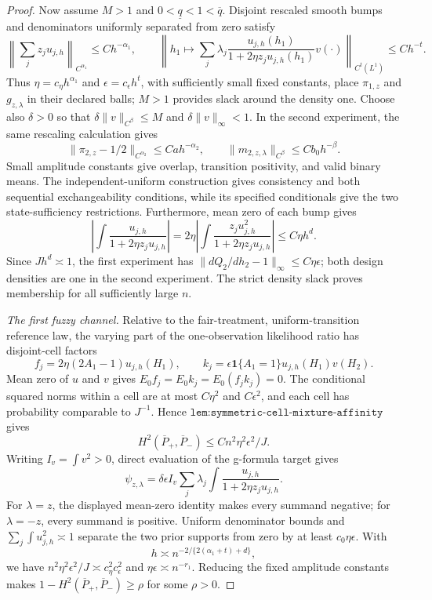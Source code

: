 \documentclass{article}
\begin{document}
\begin{proof}
Now assume \(M>1\) and \(0<\underline q<1<\overline q\). Disjoint rescaled smooth bumps and denominators uniformly separated from zero satisfy
\[\left\|\sum_jz_ju_{j,h}\right\|_{C^{\alpha_1}}\le Ch^{-\alpha_1},\qquad \left\|h_1\mapsto\sum_j\lambda_j\frac{u_{j,h}(h_1)}{1+2\eta z_ju_{j,h}(h_1)}v(\cdot)\right\|_{C^t(L^1)}\le Ch^{-t}.\]
Thus \(\eta=c_\eta h^{\alpha_1}\) and \(\epsilon=c_\epsilon h^t\), with sufficiently small fixed constants, place \(\pi_{1,z}\) and \(g_{z,\lambda}\) in their declared balls; \(M>1\) provides slack around the density one. Choose also \(\delta>0\) so that \(\delta\|v\|_{C^\beta}\le M\) and \(\delta\|v\|_\infty<1\). In the second experiment, the same rescaling calculation gives
\[\|\pi_{2,z}-1/2\|_{C^{\alpha_2}}\le Ca h^{-\alpha_2},\qquad \|m_{2,z,\lambda}\|_{C^\beta}\le Cb_0h^{-\beta}.\]
Small amplitude constants give overlap, transition positivity, and valid binary means. The independent-uniform construction gives consistency and both sequential exchangeability conditions, while its specified conditionals give the two state-sufficiency restrictions. Furthermore, mean zero of each bump gives
\[\left|\int\frac{u_{j,h}}{1+2\eta z_ju_{j,h}}\right|=2\eta\left|\int\frac{z_ju_{j,h}^2}{1+2\eta z_ju_{j,h}}\right|\le C\eta h^d.\]
Since \(Jh^d\asymp1\), the first experiment has \(\|dQ_2/dh_2-1\|_\infty\le C\eta\epsilon\); both design densities are one in the second experiment. The strict density slack proves membership for all sufficiently large \(n\).

\emph{The first fuzzy channel.} Relative to the fair-treatment, uniform-transition reference law, the varying part of the one-observation likelihood ratio has disjoint-cell factors
\[f_j=2\eta(2A_1-1)u_{j,h}(H_1),\qquad k_j=\epsilon\mathbf1\{A_1=1\}u_{j,h}(H_1)v(H_2).\]
Mean zero of \(u\) and \(v\) gives \(E_0f_j=E_0k_j=E_0(f_jk_j)=0\). The conditional squared norms within a cell are at most \(C\eta^2\) and \(C\epsilon^2\), and each cell has probability comparable to \(J^{-1}\). Hence \(\texttt{lem:symmetric-cell-mixture-affinity}\) gives
\[H^2(\overline P_+,\overline P_-)\le Cn^2\eta^2\epsilon^2/J.\]
Writing \(I_v=\int v^2>0\), direct evaluation of the g-formula target gives
\[\psi_{z,\lambda}=\delta\epsilon I_v\sum_j\lambda_j\int\frac{u_{j,h}}{1+2\eta z_ju_{j,h}}.\]
For \(\lambda=z\), the displayed mean-zero identity makes every summand negative; for \(\lambda=-z\), every summand is positive. Uniform denominator bounds and \(\sum_j\int u_{j,h}^2\asymp1\) separate the two prior supports from zero by at least \(c_0\eta\epsilon\). With
\[h\asymp n^{-2/\{2(\alpha_1+t)+d\}},\]
we have \(n^2\eta^2\epsilon^2/J\asymp c_\eta^2c_\epsilon^2\) and \(\eta\epsilon\asymp n^{-r_1}\). Reducing the fixed amplitude constants makes \(1-H^2(\overline P_+,\overline P_-)\ge\rho\) for some \(\rho>0\).


\end{proof}
\end{document}

